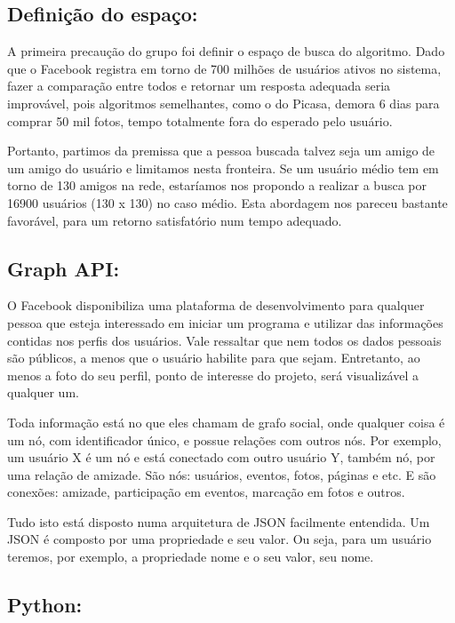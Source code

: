 \documentclass[10pt,a4paper]{article}
\begin{document}
\subsection*{Definição do espaço:}

	A primeira precaução do grupo foi definir o espaço de busca do algoritmo. Dado que o Facebook registra em torno de 700 milhões de usuários ativos no sistema, fazer a comparação entre todos e retornar um resposta adequada seria improvável, pois algoritmos semelhantes, como o do Picasa, demora 6 dias para comprar 50 mil fotos, tempo totalmente fora do esperado pelo usuário.

	Portanto, partimos da premissa que a pessoa buscada talvez seja um amigo de um amigo do usuário e limitamos nesta fronteira. Se um usuário médio tem em torno de 130 amigos na rede, estaríamos nos propondo a realizar a busca por 16900 usuários (130 x 130) no caso médio. Esta abordagem nos pareceu bastante favorável, para um retorno satisfatório num tempo adequado.

\subsection*{Graph API:}

	O Facebook disponibiliza uma plataforma de desenvolvimento para qualquer pessoa que esteja interessado em iniciar um programa e utilizar das informações contidas nos perfis dos usuários. Vale ressaltar que nem todos os dados pessoais são públicos, a menos que o usuário habilite para que sejam. Entretanto, ao menos a foto do seu perfil, ponto de interesse do projeto, será visualizável a qualquer um.

	Toda informação está no que eles chamam de grafo social, onde qualquer coisa é um nó, com identificador único, e possue relações com outros nós. Por exemplo, um usuário X é um nó e está conectado com outro usuário Y, também nó, por uma relação de amizade. São nós: usuários, eventos, fotos, páginas e etc. E são conexões: amizade, participação em eventos, marcação em fotos e outros.

	Tudo isto está disposto numa arquitetura de JSON facilmente entendida. Um JSON é composto por uma propriedade e seu valor. Ou seja, para um usuário teremos, por exemplo, a propriedade nome e o seu valor, seu nome.

\subsection*{Python:}
\end{document}

